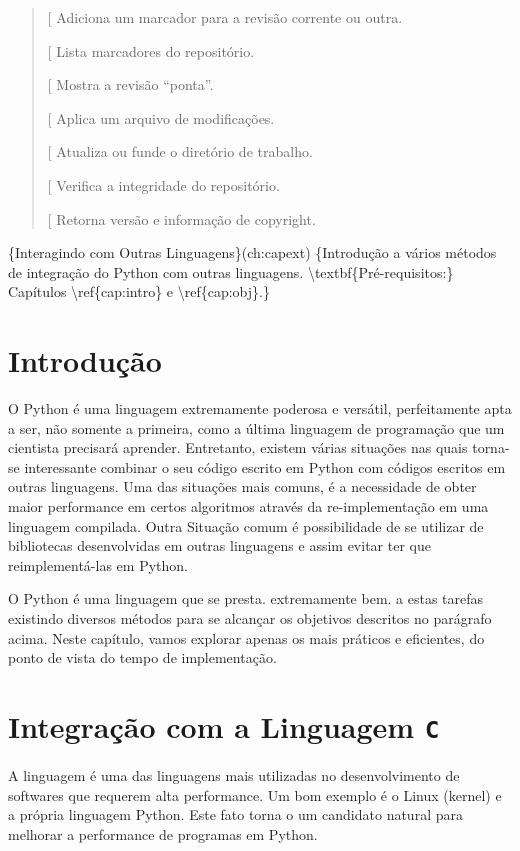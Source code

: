 \documentclass[a4paper,10pt,brazil]{sphinxmanual}
\begin{document}
\begin{quote}
{[}\code{tag}{]} Adiciona um marcador para a revisão corrente ou outra.

{[}\code{tags}{]} Lista marcadores do repositório.

{[}\code{tip}{]} Mostra a revisão ``ponta''.

{[}\code{unbundle}{]} Aplica um arquivo de modificações.

{[}\code{update}{]} Atualiza ou funde o diretório de trabalho.

{[}\code{verify}{]} Verifica a integridade do repositório.

{[}\code{version}{]} Retorna versão e informação de copyright.
\end{quote}

\{Interagindo com Outras Linguagens\}(ch:capext)
\{Introdução a vários métodos de integração do Python com outras linguagens. \textbackslash{}textbf\{Pré-requisitos:\} Capítulos \textbackslash{}ref\{cap:intro\} e \textbackslash{}ref\{cap:obj\}.\}


\chapter{Introdução}
\label{capext:introducao}\label{capext::doc}
O Python é uma linguagem extremamente poderosa e versátil,
perfeitamente apta a ser, não somente a primeira, como a última
linguagem de programação que um cientista precisará aprender.
Entretanto, existem várias situações nas quais torna-se
interessante combinar o seu código escrito em Python com códigos
escritos em outras linguagens. Uma das situações mais comuns, é a
necessidade de obter maior performance em certos algoritmos através
da re-implementação em uma linguagem compilada. Outra Situação
comum é possibilidade de se utilizar de bibliotecas desenvolvidas
em outras linguagens e assim evitar ter que reimplementá-las em
Python.

O Python é uma linguagem que se presta. extremamente bem. a estas
tarefas existindo diversos métodos para se alcançar os objetivos
descritos no parágrafo acima. Neste capítulo, vamos explorar apenas
os mais práticos e eficientes, do ponto de vista do tempo de
implementação.


\chapter{Integração com a Linguagem \texttt{C}}
\label{capext:integracao-com-a-linguagem-c}
A linguagem  é uma das linguagens mais utilizadas no
desenvolvimento de softwares que requerem alta performance. Um bom
exemplo é o Linux (kernel) e a própria linguagem Python. Este fato
torna o  um candidato natural para melhorar a performance de
programas em Python.
\end{document}
